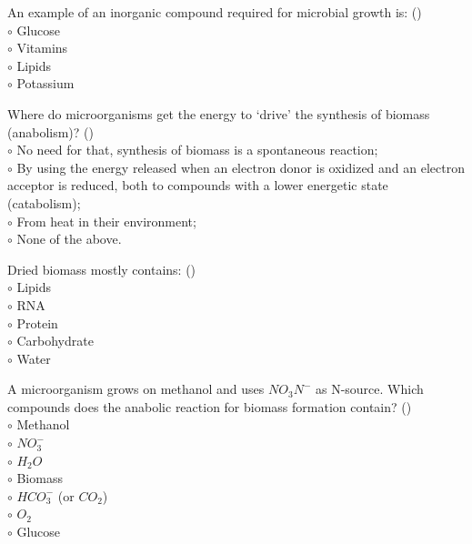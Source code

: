 \documentclass[]{beamer}
\begin{document}
\begin{frame}[shrink] {}
\addtocounter{questions}{1}
\color{blue}
An example of an inorganic compound required for microbial growth is:  ()\\
\color{black}
\setlength{\parindent}{-0.4cm}
{\color{red}$\circ$}  Glucose\\
{\color{red}$\circ$} Vitamins\\
{\color{red}$\circ$} Lipids\\
{\color{red}$\circ$} Potassium \\
\end{frame}

\begin{frame}[shrink] {}
\addtocounter{questions}{1}
\color{blue}
Where do microorganisms get the energy to ‘drive’ the synthesis of biomass (anabolism)?  ()\\
\color{black}
\setlength{\parindent}{-0.4cm}
{\color{red}$\circ$}  No need for that, synthesis of biomass is a spontaneous reaction;\\
{\color{red}$\circ$} By using the energy released when an electron donor is oxidized and an electron acceptor is reduced, both to compounds with a lower energetic state (catabolism);\\
{\color{red}$\circ$} From heat in their environment;\\
{\color{red}$\circ$} None of the above. \\
\end{frame}

\begin{frame}[shrink] {}
\addtocounter{questions}{1}
\color{blue}
Dried biomass mostly contains:  ()\\
\color{black}
\setlength{\parindent}{-0.4cm}
{\color{red}$\circ$} Lipids\\
{\color{red}$\circ$} RNA\\
{\color{red}$\circ$}  Protein \\
{\color{red}$\circ$} Carbohydrate\\
{\color{red}$\circ$} Water \\
\end{frame}

\begin{frame}[shrink] {}
\addtocounter{questions}{1}
\color{blue}
A microorganism grows on methanol and uses $NO_{3}N^{-}$ as N-source. Which compounds does the anabolic reaction for biomass formation contain?   ()\\
\color{black}
\setlength{\parindent}{-0.4cm}
{\color{red}$\circ$}  Methanol\\
{\color{red}$\circ$} $NO_{3}^{-}$\\
{\color{red}$\circ$} ${H_{2}O}$\\
{\color{red}$\circ$} Biomass\\
{\color{red}$\circ$} $HCO_{3}^{-}$ (or $CO_2$)\\
{\color{red}$\circ$} $O_2$\\
{\color{red}$\circ$} Glucose \\
\end{frame}
\end{document}
